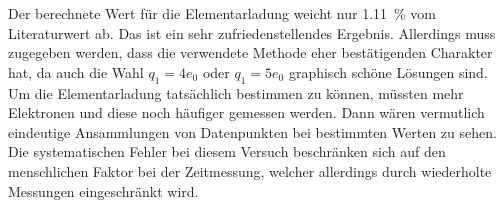 Der berechnete Wert für die Elementarladung weicht nur \SI{+1.11}{\%} vom Literaturwert \cite[Tabellen Anhang Tab. A 1.4]{Walcher} ab. Das ist ein sehr zufriedenstellendes Ergebnis. Allerdings muss zugegeben werden, dass die verwendete Methode eher bestätigenden Charakter hat, da auch die Wahl $q_1 = 4e_0$ oder $q_1 = 5e_0$ graphisch schöne Lösungen sind. Um die Elementarladung tatsächlich bestimmen zu können, müssten mehr Elektronen und diese noch häufiger gemessen werden. Dann wären vermutlich eindeutige Ansammlungen von Datenpunkten bei bestimmten Werten zu sehen. \\
Die systematischen Fehler bei diesem Versuch beschränken sich auf den menschlichen Faktor bei der Zeitmessung, welcher allerdings durch wiederholte Messungen eingeschränkt wird.